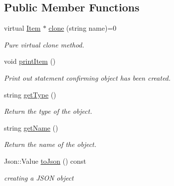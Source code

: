 \subsection*{Public Member Functions}
\begin{DoxyCompactItemize}
\item 
\hypertarget{class_item_aee86b49539ec0027b06b5c703e386de8}{}virtual \hyperlink{class_item}{Item} $\ast$ \hyperlink{class_item_aee86b49539ec0027b06b5c703e386de8}{clone} (string name)=0\label{class_item_aee86b49539ec0027b06b5c703e386de8}

\begin{DoxyCompactList}\small\item\em Pure virtual clone method. \end{DoxyCompactList}\item 
\hypertarget{class_item_ad3c548eb69bdb99ccbe41bdad8e4eb41}{}void \hyperlink{class_item_ad3c548eb69bdb99ccbe41bdad8e4eb41}{print\+Item} ()\label{class_item_ad3c548eb69bdb99ccbe41bdad8e4eb41}

\begin{DoxyCompactList}\small\item\em Print out statement confirming object has been created. \end{DoxyCompactList}\item 
\hypertarget{class_item_a2aea1cc560205b01eaf5250c21f4fc71}{}string \hyperlink{class_item_a2aea1cc560205b01eaf5250c21f4fc71}{get\+Type} ()\label{class_item_a2aea1cc560205b01eaf5250c21f4fc71}

\begin{DoxyCompactList}\small\item\em Return the type of the object. \end{DoxyCompactList}\item 
\hypertarget{class_item_a63d7f2148b699e539aae354b01559811}{}string \hyperlink{class_item_a63d7f2148b699e539aae354b01559811}{get\+Name} ()\label{class_item_a63d7f2148b699e539aae354b01559811}

\begin{DoxyCompactList}\small\item\em Return the name of the object. \end{DoxyCompactList}\item 
\hypertarget{class_item_a70ce365b03e94a33d4a137dcd9fa2818}{}Json\+::\+Value \hyperlink{class_item_a70ce365b03e94a33d4a137dcd9fa2818}{to\+Json} () const \label{class_item_a70ce365b03e94a33d4a137dcd9fa2818}

\begin{DoxyCompactList}\small\item\em creating a J\+S\+O\+N object \end{DoxyCompactList}\end{DoxyCompactItemize}
